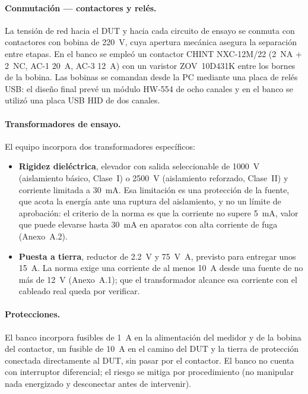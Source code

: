\paragraph{Conmutación --- contactores y relés.}
La tensión de red hacia el DUT y hacia cada circuito de ensayo se conmuta con
contactores con bobina de \SI{220}{\volt}, cuya apertura mecánica asegura la
separación entre etapas. En el banco se empleó un contactor CHINT NXC-12M/22
(2~NA + 2~NC, AC-1 \SI{20}{\ampere}, AC-3 \SI{12}{\ampere}) con un varistor
ZOV~10D431K entre los bornes de la bobina. Las bobinas se comandan desde la PC
mediante una placa de relés USB: el diseño final prevé un módulo HW-554 de ocho
canales y en el banco se utilizó una placa USB HID de dos canales.

\paragraph{Transformadores de ensayo.}
El equipo incorpora dos transformadores específicos:
\begin{itemize}
    \item \textbf{Rigidez dieléctrica}, elevador con salida seleccionable de
          \SI{1000}{\volt} (aislamiento básico, Clase~I) o \SI{2500}{\volt}
          (aislamiento reforzado, Clase~II) y corriente limitada a
          \SI{30}{\milli\ampere}. Esa limitación es una protección de la fuente,
          que acota la energía ante una ruptura del aislamiento, y no un límite de
          aprobación: el criterio de la norma es que la corriente no supere
          \SI{5}{\milli\ampere}, valor que puede elevarse hasta
          \SI{30}{\milli\ampere} en aparatos con alta corriente de fuga
          (Anexo~A.2).
    \item \textbf{Puesta a tierra}, reductor de \SI{2,2}{\volt} y
          \SI{75}{\volt\ampere}, previsto para entregar unos \SI{15}{\ampere}. La
          norma exige una corriente de al menos \SI{10}{\ampere} desde una fuente
          de no más de \SI{12}{\volt} (Anexo~A.1); que el transformador alcance esa
          corriente con el cableado real queda por verificar.
\end{itemize}

\paragraph{Protecciones.}
El banco incorpora fusibles de \SI{1}{\ampere} en la alimentación del medidor y de
la bobina del contactor, un fusible de \SI{10}{\ampere} en el camino del DUT y la
tierra de protección conectada directamente al DUT, sin pasar por el contactor.
El banco no cuenta con interruptor diferencial; el riesgo se mitiga por
procedimiento (no manipular nada energizado y desconectar antes de intervenir).

